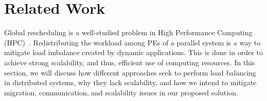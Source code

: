 \section{Related Work} \label{sec:rw}

%

Global rescheduling is a well-studied problem in High Performance Computing (HPC)~\cite{Deveci2015,diffus,grapevine,hwtopo,ZoltanParHypRepart07,Jeannot2016topo,schedmatters2016}.
Redistributing the workload among PEs of a parallel system is a way to mitigate load imbalance created by dynamic applications.
This is done in order to achieve strong scalability, and thus, efficient use of computing resources.
In this section, we will discuss how different approaches seek to perform load balancing in distributed systems, why they lack scalability, and how we intend to mitigate migration, communication, and scalability issues in our proposed solution.


